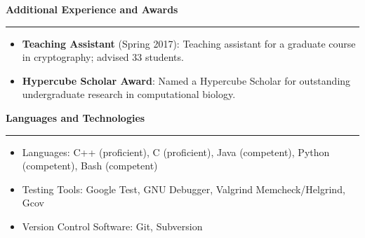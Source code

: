 \documentclass[10pt,letterpaper]{article}
\begin{document}
\medskip

\begin{large}
        \textbf{Additional Experience and Awards}
\end{large}

\smallskip \hrule \smallskip

\begin{itemize}[topsep=0pt]
        \setlength\itemsep{-0.10em}
        \item \textbf{Teaching Assistant} (Spring 2017): Teaching assistant for a graduate course in cryptography; advised 33 students.
        \item \textbf{Hypercube Scholar Award}: Named a Hypercube Scholar for outstanding undergraduate research in computational biology.
\end{itemize}

\medskip

\begin{large}
        \textbf{Languages and Technologies}
\end{large}

\smallskip \hrule \smallskip

\begin{itemize}[topsep=0pt]
        \setlength\itemsep{-0.10em}
        \item Languages: C++ (proficient), C (proficient), Java (competent), Python (competent), Bash (competent)
        \item Testing Tools: Google Test, GNU Debugger, Valgrind Memcheck/Helgrind, Gcov
        \item Version Control Software: Git, Subversion
\end{itemize}
\end{document}
